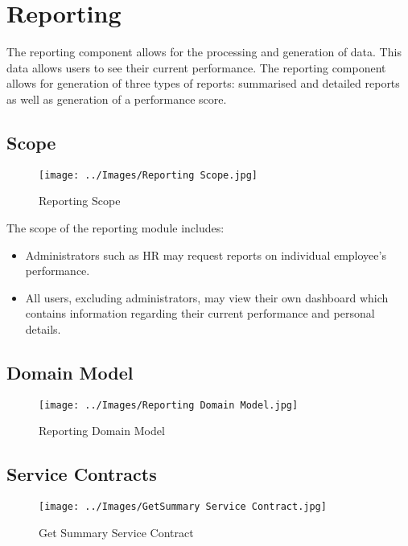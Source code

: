 \documentclass[11pt,a4paper]{article}
\begin{document}
\pagebreak

\section{Reporting}

The reporting component allows for the processing and generation of data. This data allows users to see their current performance. The reporting component allows for generation of three types of reports: summarised and detailed reports as well as generation of a performance score.

\subsection{Scope}
\begin{figure}[h!]
		\texttt{[image: ../Images/Reporting Scope.jpg]}
		\caption{Reporting Scope}
		\centering
\end{figure}
The scope of the reporting module includes:
\begin{itemize}
	\item Administrators such as HR may request reports on individual employee's performance.
	\item All users, excluding administrators, may view their own dashboard which contains information regarding their current performance and personal details.
\end{itemize}

\subsection{Domain Model}
\begin{figure}[H]
	\begin{center}
		\texttt{[image: ../Images/Reporting Domain Model.jpg]}
		\caption{Reporting Domain Model}
		\centering
	\end{center}
\end{figure}

\subsection{Service Contracts}
\begin{figure}[h!]
	\begin{center}
		\texttt{[image: ../Images/GetSummary Service Contract.jpg]}
		\caption{Get Summary Service Contract}
	\end{center}
\end{figure}
\end{document}
